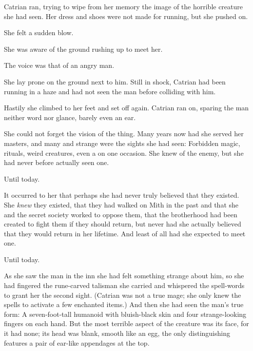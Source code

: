 \timestamp{\dateCatrianDies}
%

Catrian ran, trying to wipe from her memory the image of the horrible creature she had seen. Her dress and shoes were not made for running, but she pushed on.  

She felt a sudden blow. 

She was aware of the ground rushing up to meet her. 

 The voice was that of an angry man. 

She lay prone on the ground next to him. Still in shock, Catrian had been running in a haze and had not seen the man before colliding with him. 

Hastily she climbed to her feet and set off again.  Catrian ran on, sparing the man neither word nor glance, barely even an ear. 

 She could not forget the vision of the thing. Many years now had she served her masters, and many and strange were the sights she had seen: Forbidden magic, rituals, weird creatures, even a \dragon{} on one occasion. She knew of the enemy, but she had never before actually seen one. 

Until today. 

It occurred to her that perhaps she had never truly believed that they existed. She \emph{knew} they existed, that they had walked on Mith in the past and that she and the secret society worked to oppose them, that the brotherhood had been created to fight them if they should return, but never had she actually believed that they would return in her lifetime. And least of all had she expected to meet one. 

Until today. 

As she saw the man in the inn she had felt something strange about him, so she had fingered the rune-carved talisman she carried and whispered the spell-words to grant her the second sight. (Catrian was not a true mage; she only knew the spells to activate a few enchanted items.) 
And then she had seen the man's true form: A seven-foot-tall humanoid with bluish-black skin and four strange-looking fingers on each hand. But the most terrible aspect of the creature was its face, for it had none; its head was blank, smooth like an egg, the only distinguishing features a pair of ear-like appendages at the top. 

